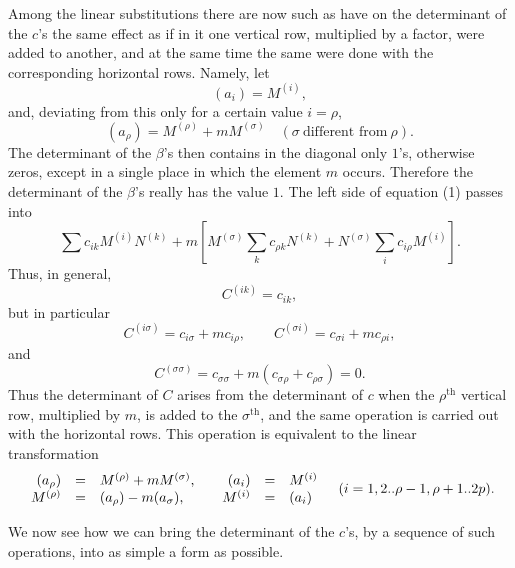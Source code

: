 \documentclass[10pt]{article}
\begin{document}
Among the linear substitutions there are now such as have on the determinant of the \(c\)'s the same effect as if in it one vertical row, multiplied by a factor, were added to another, and at the same time the same were done with the corresponding horizontal rows. Namely, let
\[
(a_i)=M^{(i)},
\]
and, deviating from this only for a certain value \(i=\rho\),
\[
(a_\rho)=M^{(\rho)}+mM^{(\sigma)}\quad(\sigma\ \text{different from}\ \rho).
\]
The determinant of the \(\beta\)'s then contains in the diagonal only \(1\)'s, otherwise zeros, except in a single place in which the element \(m\) occurs. Therefore the determinant of the \(\beta\)'s really has the value \(1\). The left side of equation (1) passes into
\[
\sum c_{ik}M^{(i)}N^{(k)}+
m\left[M^{(\sigma)}\sum_k c_{\rho k}N^{(k)}+
N^{(\sigma)}\sum_i c_{i\rho}M^{(i)}\right].
\]
Thus, in general,
\[
C^{(ik)}=c_{ik},
\]
but in particular
\[
C^{(i\sigma)}=c_{i\sigma}+mc_{i\rho},\qquad
C^{(\sigma i)}=c_{\sigma i}+mc_{\rho i},
\]
and
\[
C^{(\sigma\sigma)}=c_{\sigma\sigma}+m(c_{\sigma\rho}+c_{\rho\sigma})=0.
\]
Thus the determinant of \(C\) arises from the determinant of \(c\) when the \(\rho^{\mathrm{th}}\) vertical row, multiplied by \(m\), is added to the \(\sigma^{\mathrm{th}}\), and the same operation is carried out with the horizontal rows. This operation is equivalent to the linear transformation
\[
\begin{array}{rcl@{\qquad}rcl}
(a_\rho)&=&M^{(\rho)}+mM^{(\sigma)},&(a_i)&=&M^{(i)}\\
M^{(\rho)}&=&(a_\rho)-m(a_\sigma),&M^{(i)}&=&(a_i)
\end{array}
\quad(i=1,2..\rho-1,\rho+1..2p).
\]

We now see how we can bring the determinant of the \(c\)'s, by a sequence of such operations, into as simple a form as possible.
\end{document}
